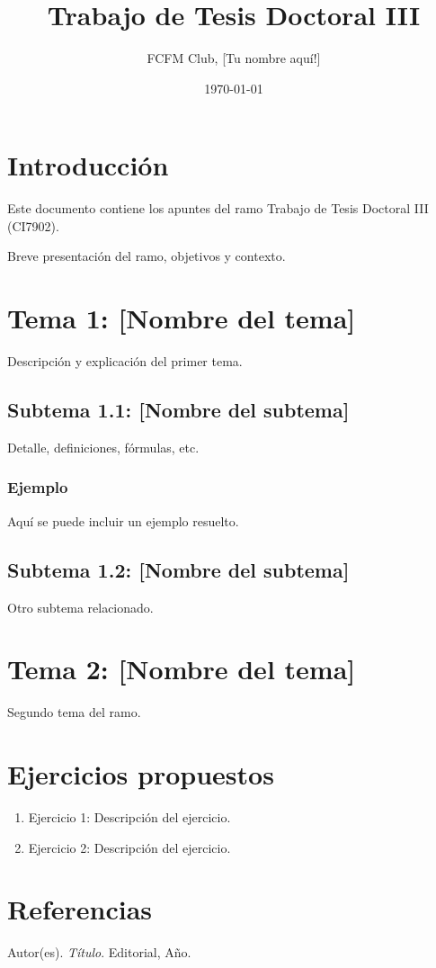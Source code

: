\documentclass[12pt]{article}
\title{Trabajo de Tesis Doctoral III}
\author{FCFM Club, [Tu nombre aquí!]}
\date{\today}
\begin{document}
\maketitle
\tableofcontents
\newpage

\section{Introducción}
Este documento contiene los apuntes del ramo Trabajo de Tesis Doctoral III (CI7902).

Breve presentación del ramo, objetivos y contexto.

\section{Tema 1: [Nombre del tema]}
Descripción y explicación del primer tema.

\subsection{Subtema 1.1: [Nombre del subtema]}
Detalle, definiciones, fórmulas, etc.

\subsubsection{Ejemplo}
Aquí se puede incluir un ejemplo resuelto.

\subsection{Subtema 1.2: [Nombre del subtema]}
Otro subtema relacionado.

\section{Tema 2: [Nombre del tema]}
Segundo tema del ramo.


\section{Ejercicios propuestos}
\begin{enumerate}
    \item Ejercicio 1: Descripción del ejercicio.
    \item Ejercicio 2: Descripción del ejercicio.
\end{enumerate}

\section{Referencias}
\begin{thebibliography}{9}
     Autor(es). \textit{Título}. Editorial, Año.
\end{thebibliography}
\end{document}
